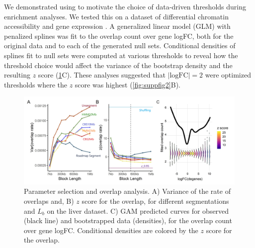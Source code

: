 We demonstrated using \bootranges to motivate the choice of data-driven thresholds 
during enrichment analyses. We tested this on a dataset of differential chromatin accessibility and gene expression 
\citep{alasoo2018shared,lee2020fluent}.
A generalized linear model (GLM) with penalized splines was
fit to the overlap count over gene logFC, both for the original
data and to each of the generated null sets.
Conditional densities of splines fit to null sets
were computed at various thresholds to reveal how
the threshold choice would affect the
variance of the bootstrap density and the resulting $z$ score
(\cref{fig:result}C).
These analyses suggested that $|\textrm{logFC}| = 2$
were optimized thresholds where the $z$ score was highest
(\cref{fig:suppfig2}B).

\newpage
\begin{figure}[t]
\centering%
\setlength{\abovecaptionskip}{-0.1cm}
\setlength{\belowcaptionskip}{-0.1cm}
\includegraphics[scale=0.06]{Figures/fig2_3.jpeg}
\caption{
  Parameter selection and overlap analysis.
  A) Variance of the rate of overlaps and,
  B) $z$ score for the overlap,
  for different segmentations and $L_b$ on the liver 
  dataset.
  C) GAM predicted curves for observed (black line) and
  bootstrapped data (densities),
  for the overlap count over gene logFC.
  Conditional densities are colored by the $z$ score for the overlap.
}
\label{fig:result}
\vspace{-.7cm}
\end{figure}


